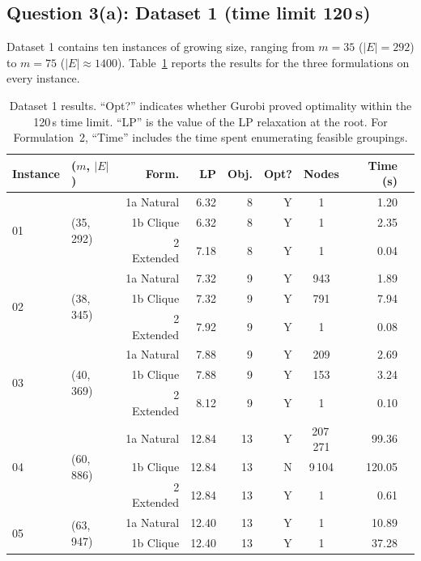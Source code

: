 \documentclass{article}
\begin{document}
\subsection{Question 3(a): Dataset 1 (time limit 120\,s)}

Dataset 1 contains ten instances of growing size, ranging from $m = 35$
($\lvert E \rvert = 292$) to $m = 75$ ($\lvert E \rvert \approx 1400$). Table~\ref{tab:ds1}
reports the results for the three formulations on every instance.

\begin{table}[h]
\centering
\footnotesize
\caption{Dataset 1 results. ``Opt?'' indicates whether Gurobi proved optimality within the
120\,s time limit. ``LP'' is the value of the LP relaxation at the root.
For Formulation~2, ``Time'' includes the time spent enumerating feasible groupings.}
\label{tab:ds1}
\begin{tabular}{llrrrrcrr}
\toprule
Instance & ($m$, $\lvert E\rvert$) & Form. & LP & Obj. & Opt? & Nodes & Time (s) \\
\midrule
\multirow{3}{*}{01} & \multirow{3}{*}{(35, 292)}
   & 1a Natural  &  6.32 &  8 & Y & 1 &   1.20 \\
 & & 1b Clique   &  6.32 &  8 & Y & 1 &   2.35 \\
 & & 2 Extended  &  7.18 &  8 & Y & 1 &   0.04 \\
\midrule
\multirow{3}{*}{02} & \multirow{3}{*}{(38, 345)}
   & 1a Natural  &  7.32 &  9 & Y &  943 &   1.89 \\
 & & 1b Clique   &  7.32 &  9 & Y &  791 &   7.94 \\
 & & 2 Extended  &  7.92 &  9 & Y &    1 &   0.08 \\
\midrule
\multirow{3}{*}{03} & \multirow{3}{*}{(40, 369)}
   & 1a Natural  &  7.88 &  9 & Y &  209 &   2.69 \\
 & & 1b Clique   &  7.88 &  9 & Y &  153 &   3.24 \\
 & & 2 Extended  &  8.12 &  9 & Y &    1 &   0.10 \\
\midrule
\multirow{3}{*}{04} & \multirow{3}{*}{(60, 886)}
   & 1a Natural  & 12.84 & 13 & Y & 207\,271 &  99.36 \\
 & & 1b Clique   & 12.84 & 13 & N & 9\,104   & 120.05 \\
 & & 2 Extended  & 12.84 & 13 & Y & 1        &   0.61 \\
\midrule
\multirow{3}{*}{05} & \multirow{3}{*}{(63, 947)}
   & 1a Natural  & 12.40 & 13 & Y & 1 &  10.89 \\
 & & 1b Clique   & 12.40 & 13 & Y & 1 &  37.28 \\

\end{tabular}
\end{table}
\end{document}
